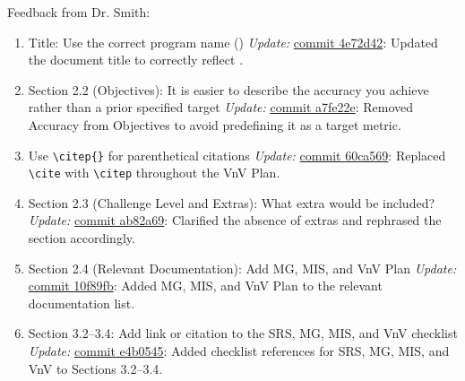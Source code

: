 \documentclass{article}
\begin{document}
Feedback from Dr. Smith:
\begin{enumerate}
    \item Title: Use the correct program name (\progname)  
    \newline \textit{Update:} \href{https://github.com/Yuanqi-X/Re-ProtGNN/commit/4e72d42dd9060d9d03a0bc1e06f10c875d0fc2a6}{commit 4e72d42}: Updated the document title to correctly reflect \progname.

    \item Section 2.2 (Objectives): It is easier to describe the accuracy you achieve rather than a prior specified target  
    \newline \textit{Update:} \href{https://github.com/Yuanqi-X/Re-ProtGNN/commit/a7fe22e434ac9329a8bd4bbd7fdc718acea58e64}{commit a7fe22e}: Removed Accuracy from Objectives to avoid predefining it as a target metric.

    \item Use \texttt{\textbackslash citep\{\}} for parenthetical citations  
    \newline \textit{Update:} \href{https://github.com/Yuanqi-X/Re-ProtGNN/commit/60ca569a555215b4b755d09cba4b2ea118b8c585}{commit 60ca569}: Replaced \texttt{\textbackslash cite} with \texttt{\textbackslash citep} throughout the VnV Plan.

    \item Section 2.3 (Challenge Level and Extras): What extra would be included?  
    \newline \textit{Update:} \href{https://github.com/Yuanqi-X/Re-ProtGNN/commit/ab82a692b7cb83c2d0b891d8743f9db70de83a0a}{commit ab82a69}: Clarified the absence of extras and rephrased the section accordingly.

    \item Section 2.4 (Relevant Documentation): Add MG, MIS, and VnV Plan  
    \newline \textit{Update:} \href{https://github.com/Yuanqi-X/Re-ProtGNN/commit/10f89fb8cbd2f7d6c391a65936aeced2210e9fb1}{commit 10f89fb}: Added MG, MIS, and VnV Plan to the relevant documentation list.

    \item Section 3.2–3.4: Add link or citation to the SRS, MG, MIS, and VnV checklist  
    \newline \textit{Update:} \href{https://github.com/Yuanqi-X/Re-ProtGNN/commit/e4b0545cea4b5f0768a212cc86b48ad29c140f97}{commit e4b0545}: Added checklist references for SRS, MG, MIS, and VnV to Sections 3.2–3.4.


\end{enumerate}
\end{document}
